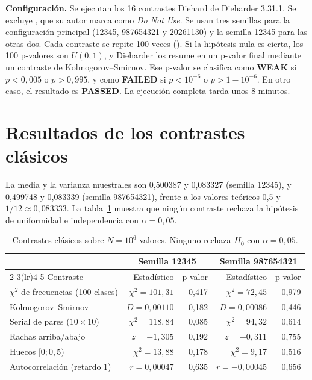 \documentclass[a4paper,11pt]{article}
\begin{document}
\textbf{Configuración.} Se ejecutan los 16 contrastes Diehard de Dieharder
3.31.1. Se excluye , que su autor marca como \emph{Do Not
Use}. Se usan tres semillas para la configuración principal (12345, 987654321 y
20261130) y la semilla 12345 para las otras dos. Cada contraste se repite 100
veces (). Si la hipótesis nula es cierta, los 100 p-valores son
$U(0,1)$, y Dieharder los resume en un p-valor final mediante un contraste de
Kolmogorov--Smirnov. Ese p-valor se clasifica como
\textbf{WEAK} si $p<0{,}005$ o $p>0{,}995$, y como \textbf{FAILED} si
$p<10^{-6}$ o $p>1-10^{-6}$. En otro caso, el resultado es \textbf{PASSED}.
La ejecución completa tarda unos 8 minutos.

\section{Resultados de los contrastes clásicos}\label{sec:clasicos}

La media y la varianza muestrales son 0,500387 y 0,083327 (semilla 12345), y
0,499748 y 0,083339 (semilla 987654321), frente a los valores teóricos 0,5 y
$1/12 \approx 0{,}083333$. La tabla~\ref{tab:clasicos} muestra que ningún
contraste rechaza la hipótesis de uniformidad e independencia con
$\alpha=0{,}05$.

\begin{table}[H]
\centering
\small
\begin{tabular}{l rr rr}
\toprule
 & \multicolumn{2}{c}{Semilla 12345} & \multicolumn{2}{c}{Semilla 987654321} \\
\cmidrule(lr){2-3}\cmidrule(lr){4-5}
Contraste & Estadístico & p-valor & Estadístico & p-valor \\
\midrule
$\chi^2$ de frecuencias (100 clases) & $\chi^2=101{,}31$ & 0,417 & $\chi^2=72{,}45$ & 0,979 \\
Kolmogorov--Smirnov & $D=0{,}00110$ & 0,182 & $D=0{,}00086$ & 0,446 \\
Serial de pares ($10\times10$) & $\chi^2=118{,}84$ & 0,085 & $\chi^2=94{,}32$ & 0,614 \\
Rachas arriba/abajo & $z=-1{,}305$ & 0,192 & $z=-0{,}311$ & 0,755 \\
Huecos $[0;0{,}5)$ & $\chi^2=13{,}88$ & 0,178 & $\chi^2=9{,}17$ & 0,516 \\
Autocorrelación (retardo 1) & $r=0{,}00047$ & 0,635 & $r=-0{,}00045$ & 0,656 \\
\bottomrule
\end{tabular}
\caption{Contrastes clásicos sobre $N=10^6$ valores. Ninguno rechaza $H_0$ con $\alpha=0{,}05$.}
\label{tab:clasicos}
\end{table}
\end{document}
